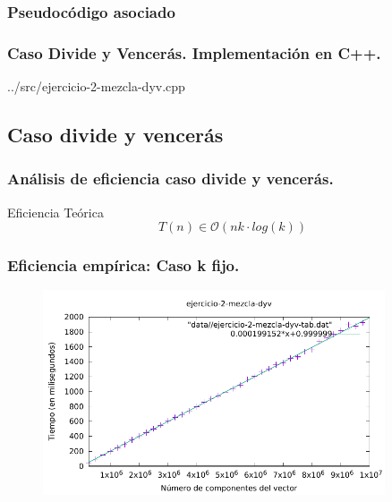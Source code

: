 \documentclass[13pt]{beamer}
\begin{document}
    \begin{frame}
        \frametitle{Pseudocódigo asociado}
                
    \end{frame}

    \begin{frame}
		\frametitle{Caso Divide y Vencerás. Implementación en C++.}
		
		{../src/ejercicio-2-mezcla-dyv.cpp} 
	\end{frame}

    \subsection{Caso divide y vencerás}

    \begin{frame}
		\frametitle{Análisis de eficiencia caso divide y vencerás.}
		 \begin{block}{Eficiencia Teórica}
		 	$$T(n) \in \mathcal{O}(nk \cdot log(k))$$
		 \end{block}
	 
	\end{frame}

    \begin{frame}
        \frametitle{Eficiencia empírica: Caso k fijo.}
        \begin{figure}
            \includegraphics[width=0.9\textwidth]{img/e2-dyv-n.pdf}
        \end{figure}
    \end{frame}
\end{document}
